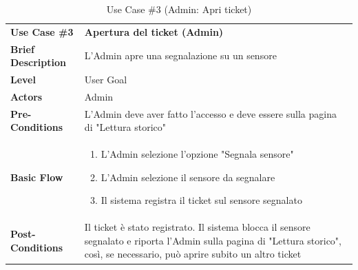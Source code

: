 	\begin{table}[h]
		\centering
		\setlength{\arrayrulewidth}{0.8pt} %
		
		\begin{tabular}{|l p{12cm}|}
			\hline
			
			\rowcolor{gray!25}
			\textbf{Use Case \#3} & \textbf{Apertura del ticket (Admin)} \\ 
			\textbf{Brief Description} & L'Admin apre una segnalazione su un sensore \\
			\textbf{Level} & User Goal\\ 
			\textbf{Actors} & Admin \\ 
			\textbf{Pre-Conditions} & L'Admin deve aver fatto l'accesso e deve essere sulla pagina di "Lettura storico" \\ 
			\textbf{Basic Flow} & \begin{enumerate}[label=\arabic*), leftmargin=*, before=\vspace{-0.7cm}, after=\vspace{-0.4cm}]
				\item L'Admin selezione l'opzione "Segnala sensore"
				\item L'Admin selezione il sensore da segnalare
				\item Il sistema registra il ticket sul sensore segnalato
			\end{enumerate} \\  
			\textbf{Post-Conditions} & Il ticket è stato registrato. Il sistema blocca il sensore segnalato e riporta l'Admin sulla pagina di "Lettura storico", così, se necessario, può aprire subito un altro ticket \\ 
			
			\hline
		\end{tabular}
		
		\vspace{0.2cm}
		\caption{Use Case \#3 (Admin: Apri ticket)}
	\end{table}
	\vspace{1cm} 
	
